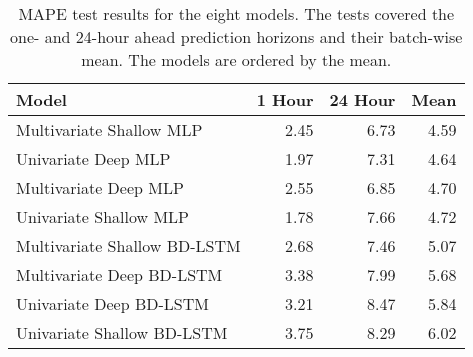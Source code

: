 \begin{table}[H]
\centering
\begin{tabular}{lrrr}
\toprule
Model & 1 Hour & 24 Hour & Mean \\
\midrule
Multivariate Shallow MLP & 2.45 & 6.73 & 4.59 \\
Univariate Deep MLP & 1.97 & 7.31 & 4.64 \\
Multivariate Deep MLP & 2.55 & 6.85 & 4.70 \\
Univariate Shallow MLP & 1.78 & 7.66 & 4.72 \\
Multivariate Shallow BD-LSTM & 2.68 & 7.46 & 5.07 \\
Multivariate Deep BD-LSTM & 3.38 & 7.99 & 5.68 \\
Univariate Deep BD-LSTM & 3.21 & 8.47 & 5.84 \\
Univariate Shallow BD-LSTM & 3.75 & 8.29 & 6.02 \\
\bottomrule
\end{tabular}
\caption{MAPE test results for the eight models. The tests covered the one- and 24-hour ahead prediction horizons and their batch-wise mean. The models are ordered by the mean.}
\label{mape}
\end{table}

